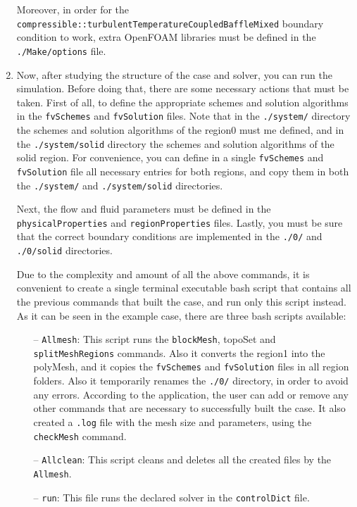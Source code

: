 \documentclass{article}
\begin{document}
\begin{enumerate}[3.1]
	Moreover, in order for the {\tt compressible::turbulentTemperatureCoupledBaffleMixed} boundary condition to work, extra OpenFOAM libraries must be defined in the {\tt ./Make/options} file.
	
	\item Now, after studying the structure of the case and solver, you can run the simulation. Before doing that, there are some necessary actions that must be taken. First of all, to define the appropriate schemes and solution algorithms in the {\tt fvSchemes} and {\tt fvSolution} files. Note that in the {\tt ./system/} directory the schemes and solution algorithms of the region0 must me defined, and in the {\tt ./system/solid} directory the schemes and solution algorithms of the solid region. For convenience, you can define in a single {\tt fvSchemes} and {\tt fvSolution} file all necessary entries for both regions, and copy them in both the {\tt ./system/} and {\tt ./system/solid} directories. 
	
	Next, the flow and fluid parameters must be defined in the {\tt physicalProperties} and {\tt regionProperties} files. Lastly, you must be sure that the correct boundary conditions are implemented in the {\tt ./0/} and {\tt ./0/solid} directories.
	
	Due to the complexity and amount of all the above commands, it is convenient to create a single terminal executable bash script that contains all the previous commands that built the case, and run only this script instead. As it can be seen in the example case, there are three bash scripts available:
	
	\begin{itemize}
		\item[--] {\tt Allmesh}: This script runs the {\tt blockMesh}, {topoSet} and {\tt splitMeshRegions} commands. Also it converts the region1 into the polyMesh, and it copies the {\tt fvSchemes} and {\tt fvSolution} files in all region folders. Also it temporarily renames the {\tt ./0/} directory, in order to avoid any errors. According to the application, the user can add or remove any other commands that are necessary to successfully built the case. It also created a {\tt .log} file with the mesh size and parameters, using the {\tt checkMesh} command.
		
		\item[--] {\tt Allclean}: This script cleans and deletes all the created files by the {\tt Allmesh}.
		
		\item[--] {\tt run}: This file runs the declared solver in the {\tt controlDict} file.
	\end{itemize}
	

\end{enumerate}
\end{document}
